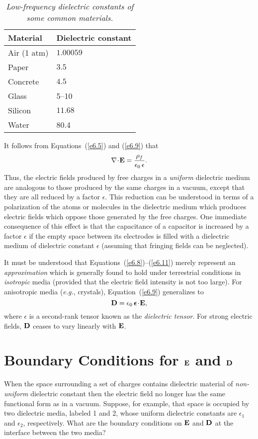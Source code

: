 \begin{table}\centering
\begin{tabular}{ll}\hline
{\bf Material} & {\bf Dielectric constant}\\[0.5ex]\hline
Air (1 atm)& $1.00059$\\[0.5ex]
Paper & $3.5$\\[0.5ex]
Concrete&$4.5$\\[0.5ex]
Glass &5--10\\[0.5ex]
Silicon & $11.68$\\[0.5ex]
Water &80.4
\end{tabular}
\caption{\em Low-frequency dielectric constants of some common materials.}\label{tdie}
\end{table}


It  follows from Equations~(\ref{e6.5}) and (\ref{e6.9})
that
\begin{equation}\label{e6.11}
\nabla\!\cdot\!{\bf E} = \frac{\rho_f}{\epsilon_0\,\epsilon}.
\end{equation}
Thus, the electric fields produced by free charges in a {\em uniform}\/ dielectric medium are analogous
to those produced by the same charges in a vacuum,  except that they are all reduced by
a factor $\epsilon$. This reduction can be understood in terms of a 
polarization of the atoms or molecules in  the dielectric medium which produces
electric fields which oppose those generated by the free charges. One immediate 
consequence of this effect is that the capacitance of a capacitor is increased by a factor
$\epsilon$ if the empty space between its electrodes is filled with a
dielectric medium of dielectric constant $\epsilon$ (assuming that
fringing fields can be neglected). 

It must be understood that Equations~(\ref{e6.8})--(\ref{e6.11}) merely represent an {\em approximation}\/
which is generally found to hold under terrestrial conditions  in {\em isotropic}\/  media (provided that
the electric field intensity is not too large). For anisotropic
media ({\em e.g.}, crystals), Equation~(\ref{e6.9}) generalizes to
\begin{equation}
{\bf D} = \epsilon_0 \,\mbox{\boldmath$ \epsilon$}\!\cdot\!{\bf E},
\end{equation}
where \mbox{\boldmath$\epsilon$} is a second-rank tensor known as the
{\em dielectric tensor}. For strong electric fields,
${\bf D}$ ceases to vary linearly with ${\bf E}$.


\section{Boundary Conditions for ${\bf E}$ and ${\bf D}$}
When the space surrounding a set of charges contains dielectric material
of {\em non-uniform} dielectric constant then the electric field no longer
has the same functional form as in  a vacuum. Suppose, for example, that 
space is occupied by  two dielectric media, labeled 1 and 2, whose uniform dielectric
constants are $\epsilon_1$ and $\epsilon_2$, respectively. What are the boundary
conditions on ${\bf E}$ and ${\bf D}$ at the interface between the
two media?


